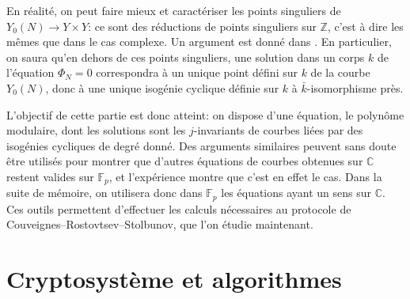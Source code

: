 \documentclass[11pt,a4paper]{article}
\newcommand{\Z}{\mathbb{Z}}
\newcommand{\C}{\mathbb{C}}
\newcommand{\F}{\mathbb{F}}
\newcommand{\vers}{\longrightarrow}
\renewcommand{\v}{\vspace{5mm}}
\theoremstyle{definition}
\begin{document}
En réalité, on peut faire mieux et caractériser les points singuliers de $Y_0(N)\vers Y\times Y$: ce sont des réductions de points singuliers sur $\Z$, c'est à dire les mêmes que dans le cas complexe. Un argument est donné dans \cite{Schoof}. En particulier, on saura qu'en dehors de ces points singuliers, une solution dans un corps $k$ de l'équation $\Phi_N = 0$ correspondra à un unique point défini sur $k$ de la courbe $Y_0(N)$, donc à une unique isogénie cyclique définie sur $k$ à $\bar{k}$-isomorphisme près.
\v

L'objectif de cette partie est donc atteint: on dispose d'une équation, le polynôme modulaire, dont les solutions sont les $j$-invariants de courbes liées par des isogénies cycliques de degré donné. Des arguments similaires peuvent sans doute être utilisés pour montrer que d'autres équations de courbes obtenues sur $\C$ restent valides sur $\F_p$, et l'expérience montre que c'est en effet le cas. Dans la suite de mémoire, on utilisera donc dans $\F_p$ les équations ayant un sens sur $\C$. Ces outils permettent d'effectuer les calculs nécessaires au protocole de Couveignes--Rostovtsev--Stolbunov, que l'on étudie maintenant.

\newpage

\section{Cryptosystème et algorithmes}
\end{document}
